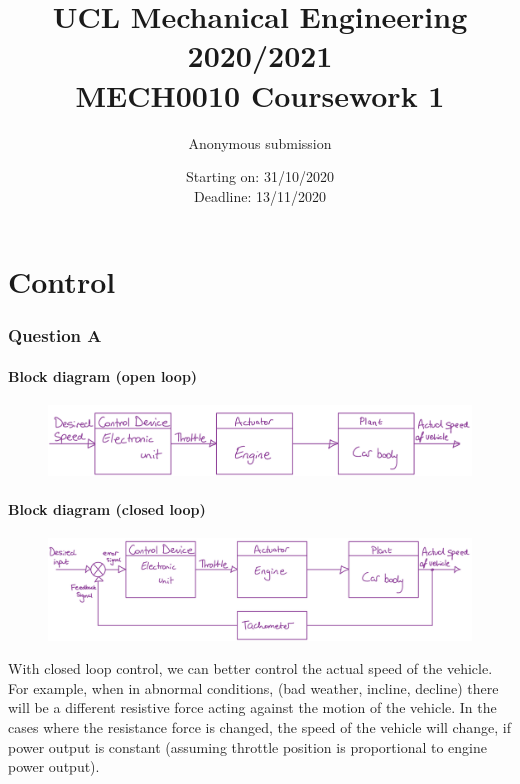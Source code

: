 \documentclass[12pt]{article}
\numberwithin{equation}{section}
\begin{document}
\title{\textbf{UCL Mechanical Engineering 2020/2021}\\MECH0010 Coursework 1}
\date{Starting on: 31/10/2020\\Deadline: 13/11/2020}
\author{Anonymous submission}
\maketitle
\tableofcontents
\newpage
\part{Control}
\section{Question A}
\subsection*{Block diagram (open loop)}
\begin{figure}[H]
  \centering
  \includegraphics[width=\textwidth]{./img/1-1blockdiagram.png}
\end{figure}
\subsection*{Block diagram (closed loop)}
\begin{figure}[H]
  \centering
  \includegraphics[width=\textwidth]{./img/1-2blockdiagram.png}
\end{figure}
With closed loop control, we can better control the actual speed of the vehicle. For example, when in abnormal conditions, (bad weather, incline, decline) there will be a different resistive force acting against the motion of the vehicle. In the cases where the resistance force is changed, the speed of the vehicle will change, if power output is constant (assuming throttle position is proportional to engine power output). 
\end{document}

